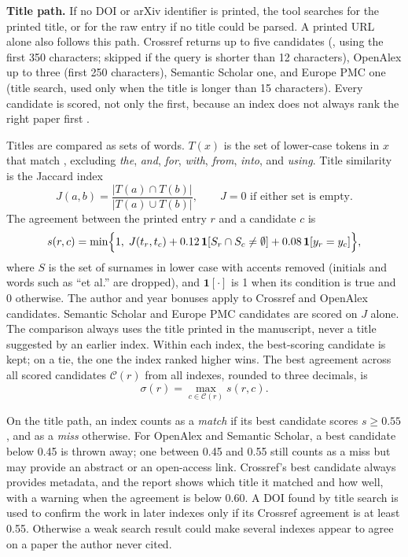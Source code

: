 \documentclass{article}
\newcommand{\vd}[1]{\texttt{\detokenize{#1}}}
\begin{document}
\textbf{Title path.} If no DOI or arXiv identifier is printed, the tool searches for the printed title, or for the raw entry if no title could be parsed. A printed URL alone also follows this path. Crossref returns up to five candidates (\vd{query.bibliographic}, using the first 350 characters; skipped if the query is shorter than 12 characters), OpenAlex up to three (first 250 characters), Semantic Scholar one, and Europe PMC one (title search, used only when the title is longer than 15 characters). Every candidate is scored, not only the first, because an index does not always rank the right paper first \cite{hendricks2020}.

Titles are compared as sets of words. $T(x)$ is the set of lower-case tokens in $x$ that match \vd{[a-z0-9]{3,}}, excluding \emph{the}, \emph{and}, \emph{for}, \emph{with}, \emph{from}, \emph{into}, and \emph{using}. Title similarity is the Jaccard index
\begin{equation}
J(a,b) = \frac{|T(a) \cap T(b)|}{|T(a) \cup T(b)|}, \qquad J = 0 \text{ if either set is empty.}
\label{eq:jaccard}
\end{equation}
The agreement between the printed entry $r$ and a candidate $c$ is
\begin{equation}
s(r,c) = \min\Bigl\{1,\; J(t_r,t_c) + 0.12\,\mathbf{1}[S_r \cap S_c \neq \emptyset] + 0.08\,\mathbf{1}[y_r = y_c]\Bigr\},
\label{eq:agree}
\end{equation}
where $S$ is the set of surnames in lower case with accents removed (initials and words such as ``et al.'' are dropped), and $\mathbf{1}[\cdot]$ is 1 when its condition is true and 0 otherwise. The author and year bonuses apply to Crossref and OpenAlex candidates. Semantic Scholar and Europe PMC candidates are scored on $J$ alone. The comparison always uses the title printed in the manuscript, never a title suggested by an earlier index. Within each index, the best-scoring candidate is kept; on a tie, the one the index ranked higher wins. The best agreement across all scored candidates $\mathcal{C}(r)$ from all indexes, rounded to three decimals, is
\begin{equation}
\sigma(r) = \max_{c \in \mathcal{C}(r)} s(r,c).
\label{eq:sigma}
\end{equation}

On the title path, an index counts as a \emph{match} if its best candidate scores $s \ge 0.55$, and as a \emph{miss} otherwise. For OpenAlex and Semantic Scholar, a best candidate below 0.45 is thrown away; one between 0.45 and 0.55 still counts as a miss but may provide an abstract or an open-access link. Crossref's best candidate always provides metadata, and the report shows which title it matched and how well, with a warning when the agreement is below 0.60. A DOI found by title search is used to confirm the work in later indexes only if its Crossref agreement is at least 0.55. Otherwise a weak search result could make several indexes appear to agree on a paper the author never cited.
\end{document}
